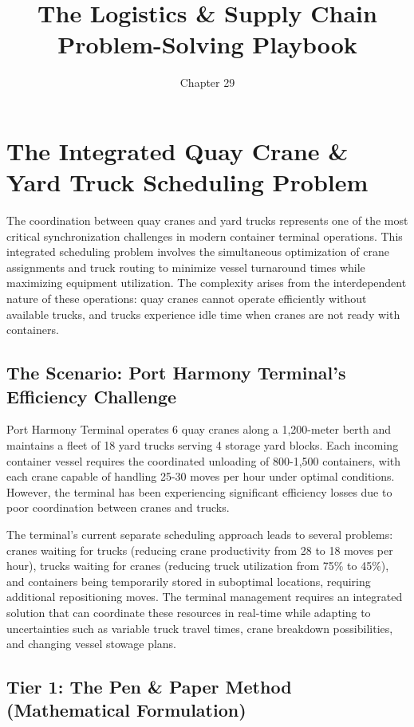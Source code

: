 \documentclass{article}
\title{The Logistics \& Supply Chain Problem-Solving Playbook}
\author{Chapter 29}
\date{}
\begin{document}
\maketitle

\section{The Integrated Quay Crane \& Yard Truck Scheduling Problem}

The coordination between quay cranes and yard trucks represents one of the most critical synchronization challenges in modern container terminal operations. This integrated scheduling problem involves the simultaneous optimization of crane assignments and truck routing to minimize vessel turnaround times while maximizing equipment utilization. The complexity arises from the interdependent nature of these operations: quay cranes cannot operate efficiently without available trucks, and trucks experience idle time when cranes are not ready with containers.

\subsection{The Scenario: Port Harmony Terminal's Efficiency Challenge}

Port Harmony Terminal operates 6 quay cranes along a 1,200-meter berth and maintains a fleet of 18 yard trucks serving 4 storage yard blocks. Each incoming container vessel requires the coordinated unloading of 800-1,500 containers, with each crane capable of handling 25-30 moves per hour under optimal conditions. However, the terminal has been experiencing significant efficiency losses due to poor coordination between cranes and trucks.

The terminal's current separate scheduling approach leads to several problems: cranes waiting for trucks (reducing crane productivity from 28 to 18 moves per hour), trucks waiting for cranes (reducing truck utilization from 75\% to 45\%), and containers being temporarily stored in suboptimal locations, requiring additional repositioning moves. The terminal management requires an integrated solution that can coordinate these resources in real-time while adapting to uncertainties such as variable truck travel times, crane breakdown possibilities, and changing vessel stowage plans.

\subsection{Tier 1: The Pen \& Paper Method (Mathematical Formulation)}
\end{document}
